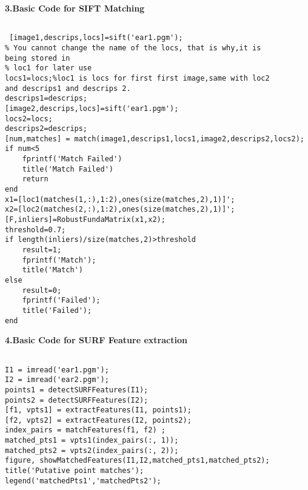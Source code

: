 \label{sec:C}
\textbf{3.Basic Code for SIFT Matching }
\begin{lstlisting}

 [image1,descrips,locs]=sift('ear1.pgm');
% You cannot change the name of the locs, that is why,it is 
being stored in
% loc1 for later use
locs1=locs;%loc1 is locs for first first image,same with loc2
and descrips1 and descrips 2.
descrips1=descrips;
[image2,descrips,locs]=sift('ear1.pgm');
locs2=locs;
descrips2=descrips;
[num,matches] = match(image1,descrips1,locs1,image2,descrips2,locs2);
if num<5
    fprintf('Match Failed')
    title('Match Failed')
    return
end
x1=[loc1(matches(1,:),1:2),ones(size(matches,2),1)]';
x2=[loc2(matches(2,:),1:2),ones(size(matches,2),1)]';
[F,inliers]=RobustFundaMatrix(x1,x2);
threshold=0.7;
if length(inliers)/size(matches,2)>threshold
    result=1;
    fprintf('Match');
    title('Match')
else
    result=0;
    fprintf('Failed');
    title('Failed');
end

\end{lstlisting}

\label{sec:D}
\textbf{4.Basic Code for SURF Feature extraction}
\begin{lstlisting}

I1 = imread('ear1.pgm');
I2 = imread('ear2.pgm');
points1 = detectSURFFeatures(I1);
points2 = detectSURFFeatures(I2);
[f1, vpts1] = extractFeatures(I1, points1);
[f2, vpts2] = extractFeatures(I2, points2);
index_pairs = matchFeatures(f1, f2) ;
matched_pts1 = vpts1(index_pairs(:, 1));
matched_pts2 = vpts2(index_pairs(:, 2));
figure, showMatchedFeatures(I1,I2,matched_pts1,matched_pts2);
title('Putative point matches');
legend('matchedPts1','matchedPts2');

\end{lstlisting}